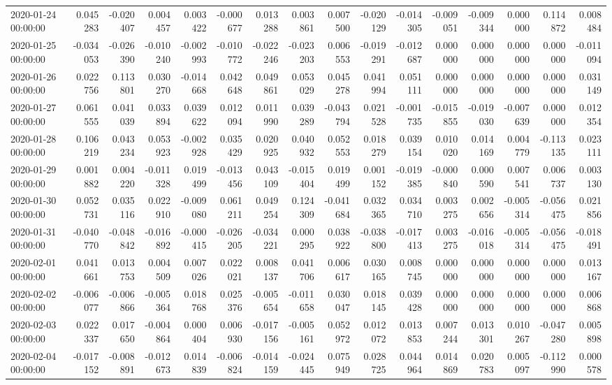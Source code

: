 \begin{tabular}{lrrrrrrrrrrrrrrr}
2020-01-24 00:00:00 & 0.045283 & -0.020407 & 0.004457 & 0.003422 & -0.000677 & 0.013288 & 0.003861 & 0.007500 & -0.020129 & -0.014305 & -0.009051 & -0.009344 & 0.000000 & 0.114872 & 0.008484 \\
2020-01-25 00:00:00 & -0.034053 & -0.026390 & -0.010240 & -0.002993 & -0.010772 & -0.022246 & -0.023203 & 0.006553 & -0.019291 & -0.012687 & 0.000000 & 0.000000 & 0.000000 & 0.000000 & -0.011094 \\
2020-01-26 00:00:00 & 0.022756 & 0.113801 & 0.030270 & -0.014668 & 0.042648 & 0.049861 & 0.053029 & 0.045278 & 0.041994 & 0.051111 & 0.000000 & 0.000000 & 0.000000 & 0.000000 & 0.031149 \\
2020-01-27 00:00:00 & 0.061555 & 0.041039 & 0.033894 & 0.039622 & 0.012094 & 0.011990 & 0.039289 & -0.043794 & 0.021528 & -0.001735 & -0.015855 & -0.019030 & -0.007639 & 0.000000 & 0.012354 \\
2020-01-28 00:00:00 & 0.106219 & 0.043234 & 0.053923 & -0.002928 & 0.035429 & 0.020925 & 0.040932 & 0.052553 & 0.018279 & 0.039154 & 0.010020 & 0.014169 & 0.004779 & -0.113135 & 0.023111 \\
2020-01-29 00:00:00 & 0.001882 & 0.004220 & -0.011328 & 0.019499 & -0.013456 & 0.043109 & -0.015404 & 0.019499 & 0.001152 & -0.019385 & -0.000840 & 0.000590 & 0.007541 & 0.006737 & 0.003130 \\
2020-01-30 00:00:00 & 0.052731 & 0.035116 & 0.022910 & -0.009080 & 0.061211 & 0.049254 & 0.124309 & -0.041684 & 0.032365 & 0.034710 & 0.003275 & 0.002656 & -0.005314 & -0.056475 & 0.021856 \\
2020-01-31 00:00:00 & -0.040770 & -0.048842 & -0.016892 & -0.000415 & -0.026205 & -0.034221 & 0.000295 & 0.038922 & -0.038800 & -0.017413 & 0.003275 & -0.016018 & -0.005314 & -0.056475 & -0.018491 \\
2020-02-01 00:00:00 & 0.041661 & 0.013753 & 0.004509 & 0.007026 & 0.022021 & 0.008137 & 0.041706 & 0.006617 & 0.030165 & 0.008745 & 0.000000 & 0.000000 & 0.000000 & 0.000000 & 0.013167 \\
2020-02-02 00:00:00 & -0.006077 & -0.006866 & -0.005364 & 0.018768 & 0.025376 & -0.005654 & -0.011658 & 0.030047 & 0.018145 & 0.039428 & 0.000000 & 0.000000 & 0.000000 & 0.000000 & 0.006868 \\
2020-02-03 00:00:00 & 0.022337 & 0.017650 & -0.004864 & 0.000404 & 0.006930 & -0.017156 & -0.005161 & 0.052972 & 0.012072 & 0.013853 & 0.007244 & 0.013301 & 0.010267 & -0.047280 & 0.005898 \\
2020-02-04 00:00:00 & -0.017152 & -0.008891 & -0.012673 & 0.014839 & -0.006824 & -0.014159 & -0.024445 & 0.075949 & 0.028725 & 0.044964 & 0.014869 & 0.020783 & 0.005097 & -0.112990 & 0.000578 \\

\end{tabular}

